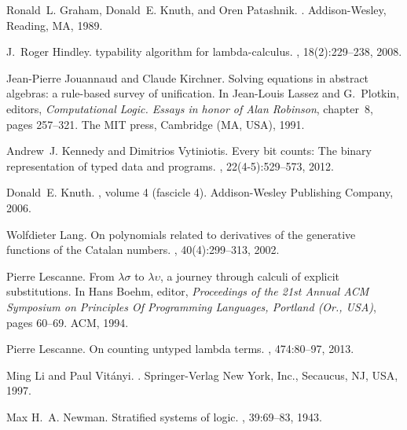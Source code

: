 \documentclass{jfp1}
\begin{document}
\begin{thebibliography}{10}
Ronald~L. Graham, Donald~E. Knuth, and Oren Patashnik.
.
\newblock Addison-Wesley, Reading, MA, 1989.

J.~Roger Hindley.
 typability algorithm for lambda-calculus.
, 18(2):229--238, 2008.

Jean-Pierre Jouannaud and Claude Kirchner.
\newblock Solving equations in abstract algebras: a rule-based survey of
  unification.
\newblock In Jean-Louis Lassez and G.~Plotkin, editors, {\em Computational
  {L}ogic. {E}ssays in honor of {A}lan {R}obinson}, chapter~8, pages 257--321.
  The MIT press, Cambridge (MA, USA), 1991.

Andrew~J. Kennedy and Dimitrios Vytiniotis.
\newblock Every bit counts: The binary representation of typed data and
  programs.
, 22(4-5):529--573, 2012.

Donald~E. Knuth.
, volume 4 (fascicle 4).
\newblock Addison-Wesley Publishing Company, 2006.

Wolfdieter Lang.
\newblock On polynomials related to derivatives of the generative functions of
  the {Catalan} numbers.
, 40(4):299--313, 2002.

Pierre Lescanne.
\newblock From $\lambda\sigma$ to $\lambda\upsilon$, a journey through calculi
  of explicit substitutions.
\newblock In Hans Boehm, editor, {\em Proceedings of the 21st Annual {ACM}
  Symposium on {P}rinciples {O}f {P}rogramming {L}anguages, {Portland (Or.,
  USA)}}, pages 60--69. ACM, 1994.

Pierre Lescanne.
\newblock On counting untyped lambda terms.
, 474:80--97, 2013.

Ming Li and Paul Vit\'{a}nyi.
.
\newblock Springer-Verlag New York, Inc., Secaucus, NJ, USA, 1997.

Max H.~A. Newman.
\newblock Stratified systems of logic.
,
  39:69--83, 1943.


\end{thebibliography}
\end{document}

